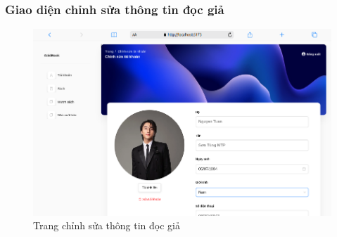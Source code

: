 \subsubsection{Giao diện chỉnh sửa thông tin đọc giả}
\begin{figure}[H]
  \centering
  \includegraphics[width=1\textwidth]{report/images/admin/taikhoan_detail.png}
  \caption{Trang chỉnh sửa thông tin đọc giả}
\end{figure}